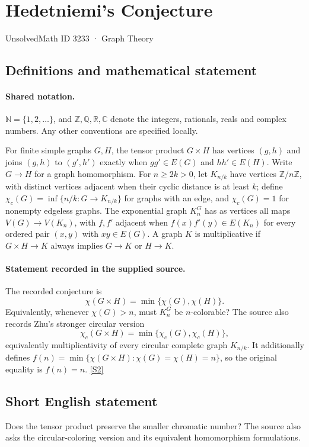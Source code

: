 \documentclass[11pt]{article}
\newcommand{\sref}[2]{\hyperlink{source:#1:#2}{[S#2]}}
\begin{document}
\setcounter{section}{3232}
\section{Hedetniemi's Conjecture}\label{3233}
{\small\sffamily UnsolvedMath ID 3233 · Graph Theory}
\subsection{Definitions and mathematical statement}

\paragraph{Shared notation.}$\mathbb N=\{1,2,\ldots\}$, and $\mathbb Z,\mathbb Q,\mathbb R,\mathbb C$ denote the integers, rationals, reals and complex numbers. Any other conventions are specified locally.


For finite simple graphs $G,H$, the tensor product $G\times H$ has vertices $(g,h)$ and joins $(g,h)$ to $(g',h')$ exactly when $gg'\in E(G)$ and $hh'\in E(H)$. Write $G\to H$ for a graph homomorphism. For $n\ge2k>0$, let $K_{n/k}$ have vertices $\mathbb Z/n\mathbb Z$, with distinct vertices adjacent when their cyclic distance is at least $k$; define $\chi_c(G)=\inf\{n/k:G\to K_{n/k}\}$ for graphs with an edge, and $\chi_c(G)=1$ for nonempty edgeless graphs. The exponential graph $K_n^G$ has as vertices all maps $V(G)\to V(K_n)$, with $f,f'$ adjacent when $f(x)f'(y)\in E(K_n)$ for every ordered pair $(x,y)$ with $xy\in E(G)$. A graph $K$ is multiplicative if $G\times H\to K$ always implies $G\to K$ or $H\to K$.
\paragraph{Statement recorded in the supplied source.}
The recorded conjecture is \[\chi(G\times H)=\min\{\chi(G),\chi(H)\}.\] Equivalently, whenever $\chi(G)>n$, must $K_n^G$ be $n$-colorable? The source also records Zhu's stronger circular version \[\chi_c(G\times H)=\min\{\chi_c(G),\chi_c(H)\},\] equivalently multiplicativity of every circular complete graph $K_{n/k}$. It additionally defines $f(n)=\min\{\chi(G\times H):\chi(G)=\chi(H)=n\}$, so the original equality is $f(n)=n$. \sref{3233}{2}
\subsection{Short English statement}
Does the tensor product preserve the smaller chromatic number? The source also asks the circular-coloring version and its equivalent homomorphism formulations.
\end{document}
